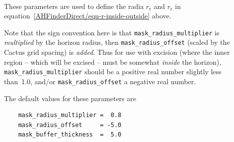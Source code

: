\begin{description}
\item[%
     \begin{tabular}{@{}l@{}}
     \code{mask\_radius\_multiplier}	\\
     \code{mask\_radius\_offset}	\\
     \code{mask\_buffer\_thickness}	%
     \end{tabular}
     ]
\mbox{}\\
	These parameters are used to define the radia $r_{\text{r}}$
	and $r_{\text{r}}$ in
	equation~\eqref{AHFinderDirect/eqn-r-inside-outside} above.

	Note that the sign convention here is that
	\verb|mask_radius_multiplier| is {\em multiplied\/}
	by the horizon radius, then \verb|mask_radius_offset|
	(scaled by the Cactus grid spacing) is {\em added\/}.
	Thus for use with excision (where the inner region --
	which will be excised -- must be somewhat {\em inside\/}
	the horizon), \verb|mask_radius_multiplier| should be a
	positive real number slightly less than~1.0, and/or
	\verb|mask_radius_offset| a negative real number.

	The default values for these parameters are
	\begin{verbatim}
	mask_radius_multiplier =  0.8
	mask_radius_offset     = -5.0
	mask_buffer_thickness  =  5.0
	\end{verbatim}


\end{description}
